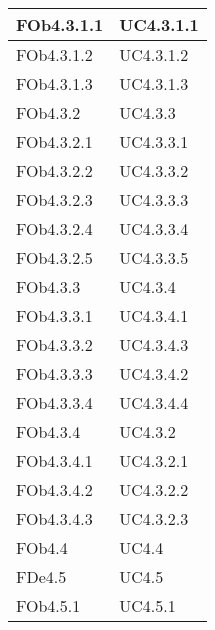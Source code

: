 \begin{longtable}{|l|p{4cm}|}
\hline
FOb4.3.1.1 & UC4.3.1.1 \linebreak  \\ 
\hline
FOb4.3.1.2 & UC4.3.1.2 \linebreak  \\ 
\hline
FOb4.3.1.3 & UC4.3.1.3 \linebreak  \\ 
\hline
FOb4.3.2 & UC4.3.3 \linebreak  \\ 
\hline
FOb4.3.2.1 & UC4.3.3.1 \linebreak  \\ 
\hline
FOb4.3.2.2 & UC4.3.3.2 \linebreak  \\ 
\hline
FOb4.3.2.3 & UC4.3.3.3 \linebreak  \\ 
\hline
FOb4.3.2.4 & UC4.3.3.4 \linebreak  \\ 
\hline
FOb4.3.2.5 & UC4.3.3.5 \linebreak  \\ 
\hline
FOb4.3.3 & UC4.3.4 \linebreak  \\ 
\hline
FOb4.3.3.1 & UC4.3.4.1 \linebreak  \\ 
\hline
FOb4.3.3.2 & UC4.3.4.3 \linebreak  \\ 
\hline
FOb4.3.3.3 & UC4.3.4.2 \linebreak  \\ 
\hline
FOb4.3.3.4 & UC4.3.4.4 \linebreak  \\ 
\hline
FOb4.3.4 & UC4.3.2 \linebreak  \\ 
\hline
FOb4.3.4.1 & UC4.3.2.1 \linebreak  \\ 
\hline
FOb4.3.4.2 & UC4.3.2.2 \linebreak  \\ 
\hline
FOb4.3.4.3 & UC4.3.2.3 \linebreak  \\ 
\hline
FOb4.4 & UC4.4 \linebreak  \\ 
\hline
FDe4.5 & UC4.5 \linebreak  \\ 
\hline
FOb4.5.1 & UC4.5.1 \linebreak  \\ 

\end{longtable}
